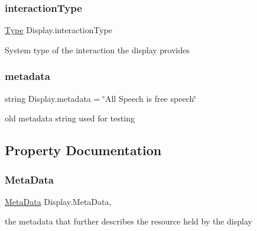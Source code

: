 \subsubsection{\texorpdfstring{interaction\+Type}{interactionType}}
{\footnotesize\ttfamily \mbox{\hyperlink{class_display_a2c80ba13fff1fd81aaa6915b28e8c14f}{Type}} Display.\+interaction\+Type\hspace{0.3cm}{\ttfamily [protected]}}



System type of the interaction the display provides 

\mbox{\label{class_display_a76e9b246ebdd9a5799de8df52279f05e}} 
\subsubsection{\texorpdfstring{metadata}{metadata}}
{\footnotesize\ttfamily string Display.\+metadata = \char`\"{}All Speech is free speech\char`\"{}\hspace{0.3cm}{\ttfamily [private]}}



old metadata string used for testing 



\subsection{Property Documentation}
\mbox{\label{class_display_a9ae693bcb1553822aed7ae887a65591c}} 
\subsubsection{\texorpdfstring{Meta\+Data}{MetaData}}
{\footnotesize\ttfamily \mbox{\hyperlink{class_meta_data}{Meta\+Data}} Display.\+Meta\+Data\hspace{0.3cm}{\ttfamily [get]}, {}}



the metadata that further describes the resource held by the display 

\mbox{\label{class_display_a32b9644a140d330a9c51cfdbb6f6093c}} 
